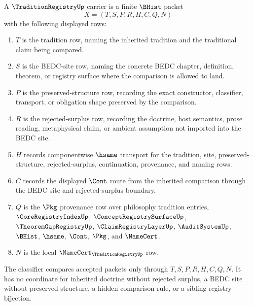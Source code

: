 \begin{definition}
\label{def:tradition-registry-carrier}
A $\TraditionRegistryUp$ carrier is a finite $\BHist$ packet
$$
X=(T,S,P,R,H,C,Q,N)
$$
with the following displayed rows:
\begin{enumerate}
\item $T$ is the tradition row, naming the inherited tradition and the traditional claim being compared.
\item $S$ is the BEDC-site row, naming the concrete BEDC chapter, definition, theorem, or registry surface where the comparison is allowed to land.
\item $P$ is the preserved-structure row, recording the exact constructor, classifier, transport, or obligation shape preserved by the comparison.
\item $R$ is the rejected-surplus row, recording the doctrine, host semantics, prose reading, metaphysical claim, or ambient assumption not imported into the BEDC site.
\item $H$ records componentwise $\hsame$ transport for the tradition, site, preserved-structure, rejected-surplus, continuation, provenance, and naming rows.
\item $C$ records the displayed $\Cont$ route from the inherited comparison through the BEDC site and rejected-surplus boundary.
\item $Q$ is the $\Pkg$ provenance row over philosophy tradition entries, $\CoreRegistryIndexUp$, $\ConceptRegistrySurfaceUp$, $\TheoremGapRegistryUp$, $\ClaimRegistryLayerUp$, $\AuditSystemUp$, $\BHist$, $\hsame$, $\Cont$, $\Pkg$, and $\NameCert$.
\item $N$ is the local $\NameCert_{\TraditionRegistryUp}$ row.
\end{enumerate}
The classifier compares accepted packets only through $T,S,P,R,H,C,Q,N$. It has no coordinate for inherited doctrine without rejected surplus, a BEDC site without preserved structure, a hidden comparison rule, or a sibling registry bijection.
\end{definition}

